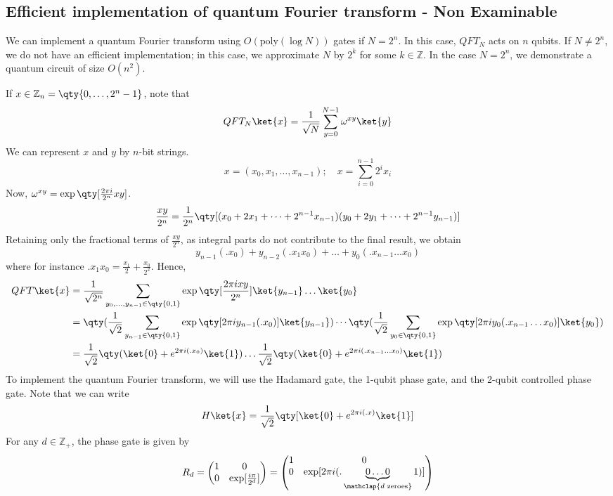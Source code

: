 \subsection{Efficient implementation of quantum Fourier transform - Non Examinable}
We can implement a quantum Fourier transform using $O(\mathrm{poly}(\log N))$ gates if $N = 2^n$.
In this case, $QFT_N$ acts on $n$ qubits.
If $N \neq 2^n$, we do not have an efficient implementation; in this case, we approximate $N$ by $2^k$ for some $k \in \mathbb Z$.
In the case $N = 2^n$, we demonstrate a quantum circuit of size $O(n^2)$.

If $x \in \mathbb Z_n = \qty{0, \dots, 2^n - 1}$, note that
\[ QFT_N \ket{x} = \frac{1}{\sqrt{N}} \sum_{y=0}^{N-1} \omega^{xy} \ket{y} \]
We can represent $x$ and $y$ by $n$-bit strings.
\[ x = (x_0, x_1, \dots, x_{n-1});\quad x = \sum_{i=0}^{n-1} 2^i x_i \]
Now, $\omega^{xy} = \exp\qty[\frac{2\pi i}{2^n} xy]$.
\[ \frac{xy}{2^n} = \frac{1}{2^n} \qty[(x_0 + 2x_1 + \dots + 2^{n-1} x_{n-1})(y_0 + 2y_1 + \dots + 2^{n-1} y_{n-1})] \]
Retaining only the fractional terms of $\frac{xy}{2^n}$, as integral parts do not contribute to the final result, we obtain
\[ y_{n-1}(.x_0) + y_{n-2}(.x_1 x_0) + \dots + y_0(.x_{n-1} \dots x_0) \]
where for instance $.x_1 x_0 = \frac{x_1}{2} + \frac{x_0}{2^2}$.
Hence,
\begin{align*}
    QFT \ket{x} &= \frac{1}{\sqrt{2^n}} \sum_{y_0, \dots, y_{n-1} \in \qty{0,1}} \exp\qty[\frac{2\pi i xy}{2^n}] \ket{y_{n-1}} \dots \ket{y_0} \\
    &= \qty(\frac{1}{\sqrt{2}} \sum_{y_{n-1} \in \qty{0,1}} \exp\qty[2 \pi i y_{n-1} (.x_0)] \ket{y_{n-1}}) \cdots \qty(\frac{1}{\sqrt{2}} \sum_{y_0 \in \qty{0,1}} \exp\qty[2 \pi i y_0 (.x_{n-1}\dots x_0)] \ket{y_0}) \\
    &= \frac{1}{\sqrt{2}} \qty(\ket{0} + e^{2\pi i (.x_0)} \ket{1}) \dots \frac{1}{\sqrt{2}} \qty(\ket{0} + e^{2\pi i (.x_{n-1} \dots x_0)} \ket{1})
\end{align*}
To implement the quantum Fourier transform, we will use the Hadamard gate, the 1-qubit phase gate, and the 2-qubit controlled phase gate.
Note that we can write
\[ H\ket{x} = \frac{1}{\sqrt{2}} \qty[\ket{0} + e^{2\pi i(.x)} \ket{1}] \]
For any $d \in \mathbb Z_+$, the phase gate is given by
\[ R_d = \begin{pmatrix}
    1 & 0 \\
    0 & \exp[\frac{i\pi}{2^d}]
\end{pmatrix} = \begin{pmatrix}
    1 & 0 \\
    0 & \exp[2\pi i(.\underbrace{0\dots 0}_{\mathclap{d \text{ zeroes}}}1)]
\end{pmatrix} \]

